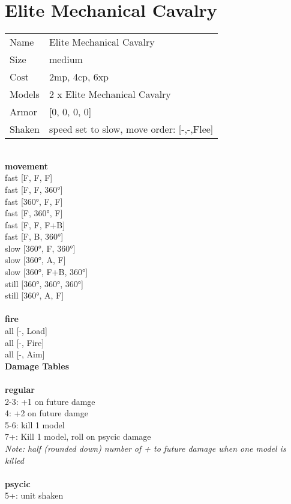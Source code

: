 \clearpage

\section{ Elite Mechanical Cavalry }

\begin{tabular}{ll}
  Name & Elite Mechanical Cavalry \\
  Size & medium\\
  Cost & 2mp, 4cp, 6xp\\
  Models & 2 x Elite Mechanical Cavalry\\
  Armor & [0, 0, 0, 0]\\
  Shaken & speed set to slow, move order: [-,-,Flee]\\
\end{tabular}

\noindent 

\ \\ {\bf movement } \\
fast [F, F, F] \\
fast [F, F, 360°] \\
fast [360°, F, F] \\
fast [F, 360°, F] \\
fast [F, F, F+B] \\
fast [F, B, 360°] \\
slow [360°, F, 360°] \\
slow [360°, A, F] \\
slow [360°, F+B, 360°] \\
still [360°, 360°, 360°] \\
still [360°, A, F] \\
\ \\ {\bf fire } \\
all [-, Load] \\
all [-, Fire] \\
all [-, Aim] \\


{\bf Damage Tables} \\
\ \\ {\bf regular } \\
2-3: +1 on future damge \\
4: +2 on future damge \\
5-6: kill 1 model \\
7+: Kill 1 model, roll on psycic damage \\
{{\it Note: half (rounded down) number of + to future damage when one model is killed}} \\
\ \\ {\bf psycic } \\
5+: unit shaken \\


